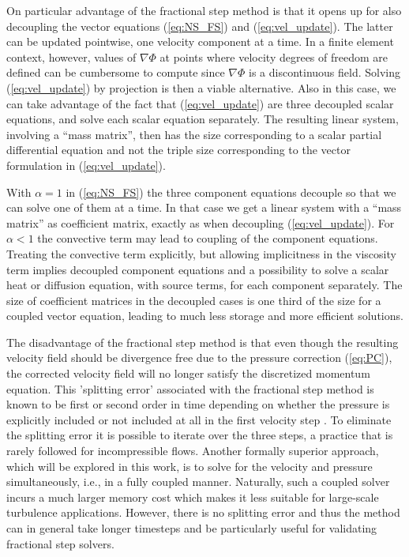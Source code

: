 On particular advantage of the fractional step method is that it opens
up for also decoupling the vector equations (\ref{eq:NS_FS})
and (\ref{eq:vel_update}). The latter can be updated pointwise,
one velocity component at a time. In a finite element context, however,
values of $\nabla\Phi$ at points where velocity degrees of freedom
are defined can be cumbersome to compute since $\nabla\Phi$ is
a discontinuous field. Solving (\ref{eq:vel_update}) by projection
is then a viable alternative. Also in this case, we can take advantage
of the fact that (\ref{eq:vel_update}) are three decoupled
scalar equations, and solve each scalar equation separately.
The resulting linear system, involving a ``mass matrix'', then has the size 
corresponding to a scalar partial differential equation and not the
triple size corresponding to the vector formulation in (\ref{eq:vel_update}).

With $\alpha =1$ in (\ref{eq:NS_FS}) the three component equations
decouple so that we can solve one of them at a time. In that case
we get a linear system with a ``mass matrix'' as coefficient matrix,
exactly as when decoupling (\ref{eq:vel_update}).
For $\alpha <1$ the convective term may lead to coupling of the
component equations. Treating the convective term explicitly, but
allowing implicitness in the viscosity term implies decoupled
component equations and a possibility to solve a scalar heat or 
diffusion equation, with source terms, for each component separately.
The size of coefficient matrices in the decoupled cases is one third
of the size for a coupled vector equation, leading to much less
storage and more efficient solutions.


The disadvantage of the fractional step method is
that even though the resulting velocity field should be divergence
free due to the pressure correction (\ref{eq:PC}), 
the corrected velocity field will
no longer satisfy the discretized momentum equation. This 'splitting
error' associated with the fractional step method is known to be first
or second order in time depending on whether the pressure is
explicitly included or not included at all in the first velocity
step \cite{Gue06}. To eliminate the splitting error it is possible to iterate over
the three steps, a practice that is rarely followed for incompressible
flows. Another formally superior approach, which will be explored in
this work, is to solve for the velocity and pressure
simultaneously, i.e., in a fully coupled manner. 
Naturally, such a coupled solver incurs a much larger
memory cost which makes it  less suitable for large-scale turbulence
applications. However, there is no splitting error and thus the method
can in general take longer timesteps and be particularly useful for
validating fractional step solvers.

